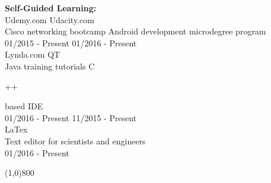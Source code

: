 \documentclass[8pt]{paper}
\begin{document}
\begin{flushleft}
\large{\bfseries{Self-Guided Learning:}}\\
[2mm]

Udemy.com \hspace{90mm} Udacity.com\\
Cisco networking bootcamp \hspace{61mm} Android development microdegree program\\
01/2015 - Present \hspace{79mm} 01/2016 - Present\\
[1mm]

Lynda.com \hspace{91mm} QT\\
Java training tutorials \hspace{71mm} C\begin{small}++\end{small} based IDE\\
01/2016 - Present \hspace{79mm} 11/2015 - Present\\
[1mm]

LaTex\\
Text editor for scientists and engineers\\
01/2016 - Present\\

\end{flushleft}

\line(1,0){800}\\
\end{document}
